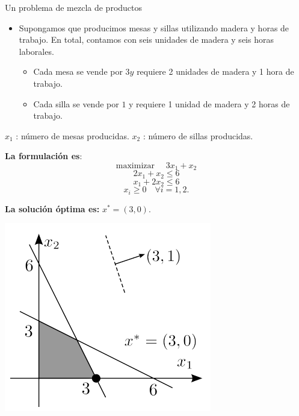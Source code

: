 \documentclass{beamer}
\begin{document}
\begin{frame}{Un problema de mezcla de productos}
    \begin{itemize}
        \item Supongamos que producimos mesas y sillas utilizando madera y horas de trabajo. En total, contamos con seis unidades de madera y seis horas laborales.
        \begin{itemize}
            \item Cada mesa se vende por $3 y$ requiere 2 unidades de madera y 1 hora de trabajo.
            \item Cada silla se vende por $1$ y requiere 1 unidad de madera y 2 horas de trabajo.
        \end{itemize}
    \end{itemize}
\pause    
    \(x_1\) : número de mesas producidas. \(x_2\) : número de sillas producidas.\\
\begin{multicols}{2}
    \textbf{La formulación es}:
    \[
    \text{maximizar } \quad 3x_1 + x_2
    \]
    \[
    2x_1 + x_2 \leq 6
    \]
    \[
    x_1 + 2x_2 \leq 6
    \]
    \[
    x_i \geq 0 \quad \forall i = 1, 2.
    \]
    
    \textbf{La solución óptima es:} $x^* = (3,0)$.
    \begin{center}
        \includegraphics[scale=.5]{images/shadows1.png}
    \end{center}
\end{multicols}
\end{frame}
\end{document}

